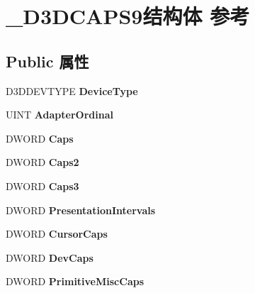 \hypertarget{struct___d3_d_c_a_p_s9}{}\section{\+\_\+\+D3\+D\+C\+A\+P\+S9结构体 参考}
\label{struct___d3_d_c_a_p_s9}
\subsection*{Public 属性}
\begin{DoxyCompactItemize}
\item 
\mbox{\label{struct___d3_d_c_a_p_s9_a064d3cd2960536815552de5cc9d2b7fc}} 
D3\+D\+D\+E\+V\+T\+Y\+PE {\bfseries Device\+Type}
\item 
\mbox{\label{struct___d3_d_c_a_p_s9_a8594561304fd0b8177f3172dc628b685}} 
U\+I\+NT {\bfseries Adapter\+Ordinal}
\item 
\mbox{\label{struct___d3_d_c_a_p_s9_a8d2611a604ad2787024bcfc2f64eaf77}} 
D\+W\+O\+RD {\bfseries Caps}
\item 
\mbox{\label{struct___d3_d_c_a_p_s9_a4127d126bc0b2a88ae8e70835343776b}} 
D\+W\+O\+RD {\bfseries Caps2}
\item 
\mbox{\label{struct___d3_d_c_a_p_s9_a1e08b00a5119ceb68298601dda0630eb}} 
D\+W\+O\+RD {\bfseries Caps3}
\item 
\mbox{\label{struct___d3_d_c_a_p_s9_aacb9f695c2b42a8fd52ab2a9e88134de}} 
D\+W\+O\+RD {\bfseries Presentation\+Intervals}
\item 
\mbox{\label{struct___d3_d_c_a_p_s9_a8983ab7b24645b8d55760825db31a164}} 
D\+W\+O\+RD {\bfseries Cursor\+Caps}
\item 
\mbox{\label{struct___d3_d_c_a_p_s9_a32f835c0a0c54eaf44ad7bcc0d5f2518}} 
D\+W\+O\+RD {\bfseries Dev\+Caps}
\item 
\mbox{\label{struct___d3_d_c_a_p_s9_a58c2411b58ad44d697e95468f7241786}} 
D\+W\+O\+RD {\bfseries Primitive\+Misc\+Caps}

\end{DoxyCompactItemize}
